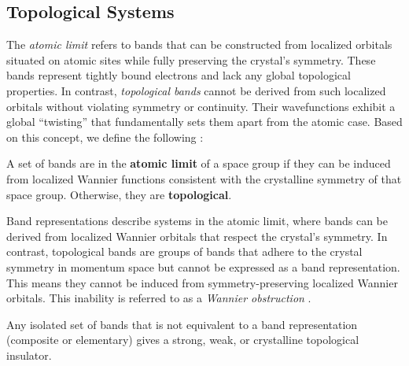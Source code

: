 \documentclass[12pt]{report}
\begin{document}
%

\subsection{Topological Systems} \label{subsec:topological_systems}

The \textit{atomic limit} refers to bands that can be constructed from localized orbitals situated on atomic sites while fully preserving the crystal's symmetry. These bands represent tightly bound electrons and lack any global topological properties. In contrast, \textit{topological bands} cannot be derived from such localized orbitals without violating symmetry or continuity. Their wavefunctions exhibit a global ``twisting'' that fundamentally sets them apart from the atomic case. Based on this concept, we define the following \cite{building_blocks2018}:

\begin{definition}
A set of bands are in the \textbf{atomic limit} of a space group if they can be induced from localized Wannier functions consistent with the crystalline symmetry of that space group. Otherwise, they are \textbf{topological}.
\end{definition}

Band representations describe systems in the atomic limit, where bands can be derived from localized Wannier orbitals that respect the crystal's symmetry. In contrast, topological bands are groups of bands that adhere to the crystal symmetry in momentum space but cannot be expressed as a band representation. This means they cannot be induced from symmetry-preserving localized Wannier orbitals. This inability is referred to as a \textit{Wannier obstruction} \cite{FragileTopology_Po2018, building_blocks2018}.

\begin{theorem} \label{th:topo_insul}
Any isolated set of bands that is not equivalent to a band representation (composite or elementary) gives a strong, weak, or crystalline topological insulator.
\end{theorem}
\end{document}
